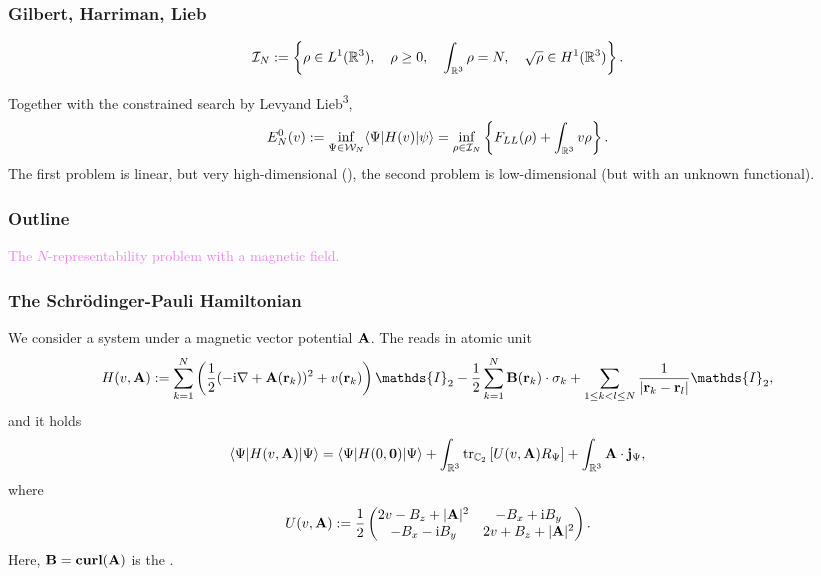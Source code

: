 \documentclass[9pt,xcolor=dvipsnames]{beamer}
\begin{document}
\begin{frame}

\frametitle{Gilbert, Harriman, Lieb}

\begin{theorem} 
	\[
		{\mathcal I}_N := \left\{ \rho \in L^1({\mathbb R}^3), \quad \rho \ge 0, \quad \int_{{\mathbb R}^3} \rho = N, \quad \sqrt{\rho} \in H^1({\mathbb R}^3) \right\}.
	\]
\end{theorem}

Together with the constrained search by Levy\footnotemark and Lieb\textsuperscript{3},
\begin{align*}
	E_N^0(v) := \inf_{\Psi \in {\mathcal W}_N} \langle \Psi | H(v) | \psi \rangle = \inf_{\rho \in {\mathcal I}_N} \left\{ F_{LL}(\rho) + \int_{{\mathbb R}^3} v \rho \right\}.
\end{align*}
The first problem is linear, but very high-dimensional (), the second problem is low-dimensional (but with an unknown functional).

\addtocounter{footnote}{-4}
  
  
  
   
  \addtocounter{footnote}{-4}

\end{frame}


\begin{frame}

\frametitle{Outline}


\begin{center}
\textcolor{violet}{
	\huge{The $N$-representability problem with a magnetic field.}}
\end{center}

\end{frame}



\begin{frame}

\frametitle{The Schrödinger-Pauli Hamiltonian}

We consider a system under a magnetic vector potential ${\bold A}$. The  reads in atomic unit
\[
	H(v, \bA) := \sum_{k=1}^N \left( \dfrac12 (-\ri \nabla + \bA(\br_k))^2 + v(\br_k) \right) \mathds{I}_2 - \dfrac12 \sum_{k=1}^N \bB(\br_k) \cdot \bsigma_k + \sum_{1\le k < l \le N} \dfrac{1}{| \br_k - \br_l |} \mathds{I}_2,
\]
and it holds
\[
	\langle \Psi | H(v, {\bold A}) | \Psi \rangle = \langle \Psi | H(0, {\bold 0}) | \Psi \rangle + 
		\int_{{\mathbb R}^3} {\rm tr}_{{\mathbb C}_2} \left[ U(v, {\bold A}) R_\Psi \right] + \int_{{\mathbb R}^3} {\bold A} \cdot {\bold j}_\Psi,
\]
where
\[
	U(v, {\bold A}) :=\dfrac12 \begin{pmatrix} 2v - B_z + | {\bold A} |^2 & -  B_x + {\mathrm{i}} B_y \\ -  B_x - {\mathrm{i}}  B_y & 2v +  B_z +  | {\bold A} |^2 \end{pmatrix}.
\]
Here, ${\bold B} = \textbf{curl}({\bold A})$ is the . 
\end{frame}
\end{document}
